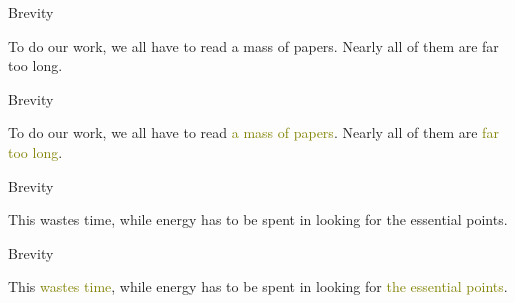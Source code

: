 \documentclass[
  ignorenonframetext,
]{beamer}
\begin{document}
\begin{frame}{Brevity}
\protect\hypertarget{brevity-1}{}
\Large

To do our work, we all have to read a mass of papers. Nearly all of them
are far too long.

\par

\vfill
\Huge


\vfill
\end{frame}

\begin{frame}{Brevity}
\protect\hypertarget{brevity-2}{}
\Large

To do our work, we all have to read \textcolor{olive}{a mass of papers}.
Nearly all of them are \textcolor{olive}{far too long}.

\par

\vfill
\Huge


\vfill
\end{frame}

\begin{frame}{Brevity}
\protect\hypertarget{brevity-3}{}
\Large

This wastes time, while energy has to be spent in looking for the
essential points.

\par

\vfill\Huge


\vfill

\mbox{}
\end{frame}

\begin{frame}{Brevity}
\protect\hypertarget{brevity-4}{}
\Large

This \textcolor{olive}{wastes time}, while energy has to be spent in
looking for \textcolor{olive}{the essential points}.

\par

\vfill\Huge


\vfill
\end{frame}
\end{document}
